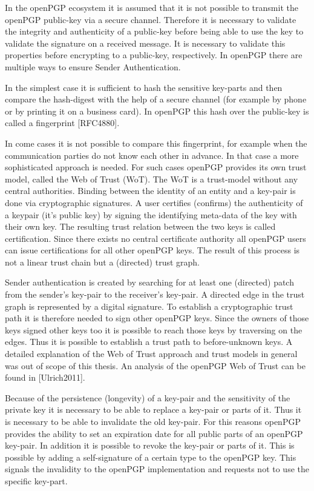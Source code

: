 In the openPGP ecosystem it is assumed that it is not possible to transmit the openPGP public-key via a secure channel. Therefore it is necessary to validate the integrity and authenticity of a public-key before being able to use the key to validate the signature on a received message. It is necessary to validate this properties before encrypting to a public-key, respectively. In openPGP there are multiple ways to ensure Sender Authentication.

In the simplest case it is sufficient to hash the sensitive key-parts and then compare the hash-digest with the help of a secure channel (for example by phone or by printing it on a business card). In openPGP this hash over the public-key is called a fingerprint [RFC4880].


In come cases it is not possible to compare this fingerprint, for example when the communication parties do not know each other in advance. In that case a more sophisticated approach is needed. For such cases openPGP provides its own trust model, called the Web of Trust (WoT). The WoT is a trust-model without any central authorities. Binding between the identity of an entity and a key-pair is done via cryptographic signatures. A user certifies (confirms) the authenticity of a keypair (it's public key) by signing the identifying meta-data of the key with their own key. The resulting trust relation between the two keys is called certification. Since there exists no central certificate authority all openPGP users can issue certifications for all other openPGP keys. The result of this process is not a linear trust chain but a (directed) trust graph. 

Sender authentication is created by searching for at least one (directed) patch from the sender's key-pair to the receiver's key-pair. A directed edge in the trust graph is represented by a digital signature. To establish a cryptographic trust path it is therefore needed to sign other openPGP keys. Since the owners of those keys signed other keys too it is possible to reach those keys by traversing on the edges. Thus it is possible to establish a trust path to before-unknown keys.
A detailed explanation of the Web of Trust approach and trust models in general was out of scope of this thesis. An analysis of the openPGP Web of Trust can be found in [Ulrich2011].


Because of the persistence (longevity) of a key-pair and the sensitivity of the private key it is necessary to be able to replace a key-pair or parts of it. Thus it is necessary to be able to invalidate the old key-pair. For this reasons openPGP provides the ability to set an expiration date for all public parts of an openPGP key-pair. In addition it is possible to revoke the key-pair or parts of it. This is possible by adding a self-signature of a certain type to the openPGP key. This signals the invalidity to the openPGP implementation and requests not to use the specific key-part.


